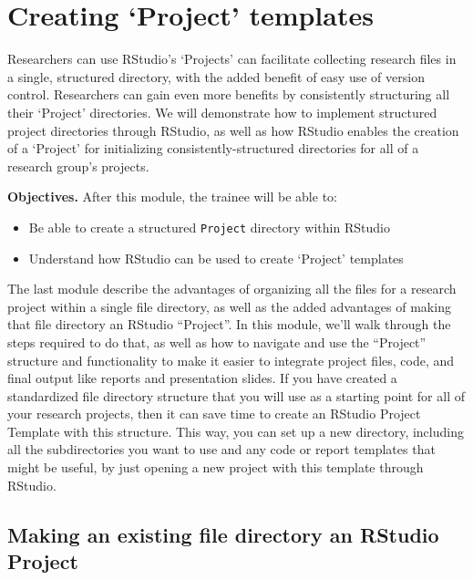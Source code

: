 \documentclass[]{tufte-book}
\providecommand{\tightlist}{%
  \setlength{\itemsep}{0pt}\setlength{\parskip}{0pt}}
\begin{document}
\hypertarget{module7}{%
\section{Creating `Project' templates}\label{module7}}

Researchers can use RStudio's `Projects' can facilitate collecting research
files in a single, structured directory, with the added benefit of easy use of
version control. Researchers can gain even more benefits by consistently
structuring all their `Project' directories. We will demonstrate how to
implement structured project directories through RStudio, as well as how RStudio
enables the creation of a `Project' for initializing consistently-structured
directories for all of a research group's projects.

\textbf{Objectives.} After this module, the trainee will be able to:

\begin{itemize}
\tightlist
\item
  Be able to create a structured \texttt{Project} directory within RStudio
\item
  Understand how RStudio can be used to create `Project' templates
\end{itemize}

The last module describe the advantages of organizing all the files for a
research project within a single file directory, as well as the added
advantages of making that file directory an RStudio ``Project''. In this
module, we'll walk through the steps required to do that, as well as
how to navigate and use the ``Project'' structure and functionality to
make it easier to integrate project files, code, and final output like
reports and presentation slides. If you have created a standardized
file directory structure that you will use as a starting point for all of
your research projects, then it can save time to create an RStudio Project
Template with this structure. This way, you can set up a new directory,
including all the subdirectories you want to use and any code or report
templates that might be useful, by just opening a new project with this
template through RStudio.

\hypertarget{making-an-existing-file-directory-an-rstudio-project}{%
\subsection{Making an existing file directory an RStudio Project}\label{making-an-existing-file-directory-an-rstudio-project}}
\end{document}
